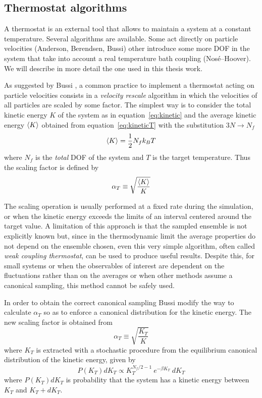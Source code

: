 \subsection{Thermostat algorithms} %
A thermostat is an external tool that allows to maintain a system at a constant temperature. Several algorithms
are available. Some act directly on particle velocities (Anderson, Berendsen, Bussi) other introduce some
more \ac{DOF} in the system that take into account a real temperature bath coupling (Nosé--Hoover). We will
describe in more detail the one used in this thesis work.

As suggested by Bussi \etal \cite{Bussi}, a common practice to implement a thermostat acting on particle
velocities consists in a \textit{velocity rescale} algorithm in which the velocities of all particles are
scaled by some factor. The simplest way is to consider the total kinetic energy $K$ of the system as in
equation~\eqref{eq:kinetic} and the average kinetic energy $\left \langle K \right \rangle$ obtained from equation~\eqref{eq:kineticT}
with the substitution $3N\rightarrow N_f$
\begin{equation*}
	\left \langle K \right \rangle = \frac{1}{2}N_f k_B T
\end{equation*}
where $N_f$ is the \textit{total} \ac{DOF} of the system and $T$ is the target temperature. Thus the scaling
factor is defined by
\begin{equation*}
	\alpha_{T} \equiv \sqrt{\frac{\left \langle K \right \rangle}{K}}
\end{equation*}

The scaling operation is usually performed at a fixed rate during the simulation, or when the kinetic energy
exceeds the limits of an interval centered around the target value. A limitation of this approach is that the 
sampled ensemble is not explicitly known but, since in the thermodynamic limit the average properties do not 
depend on the ensemble chosen, even this very simple algorithm, often called \textit{weak coupling thermostat}, 
can be used to produce useful results. Despite this, for small systems or when the observables of interest are 
dependent on the fluctuations rather than on the averages or when other methods assume a canonical sampling, this 
method cannot be safely used.

In order to obtain the correct canonical sampling Bussi \etal \cite{Bussi} modify the way to calculate
$\alpha_T$ so as to enforce a canonical distribution for the kinetic energy. The new scaling factor is obtained
from
\begin{equation*}
	\alpha_{T} \equiv \sqrt{\frac{K_T}{K}}
\end{equation*}
where $K_T$ is extracted with a stochastic procedure from the equilibrium canonical distribution of the kinetic
energy, given by
\begin{equation*}
	P(K_T)dK_T \propto K_T^{N_f/2-1}\ e^{-\beta K_T}\ dK_T
\end{equation*}
where $P(K_T)dK_T$ is probability that the system has a kinetic energy between $K_T$ and $K_T + dK_T$.

